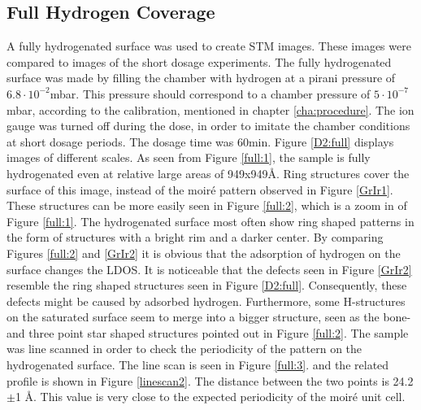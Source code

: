 \subsection{Full Hydrogen Coverage}
A fully hydrogenated surface was used to create STM images. These images were compared to images of the short dosage experiments. The fully hydrogenated surface was made by filling the chamber with hydrogen at a pirani pressure of $6.8 \cdot 10^{-2}$mbar. This pressure should correspond to a chamber pressure of $5 \cdot 10^{-7}$mbar, according to the calibration, mentioned in chapter \ref{cha:procedure}. The ion gauge was turned off during the dose, in order to imitate the chamber conditions at short dosage periods. The dosage time was 60min. Figure \ref{D2:full} displays images of different scales. As seen from Figure \ref{full:1}, the sample is fully hydrogenated even at relative large areas of 949x949Å. Ring structures cover the surface of this image, instead of the moiré pattern observed in Figure \ref{GrIr1}. These structures can be more easily seen in Figure \ref{full:2}, which is a zoom in of Figure \ref{full:1}. The hydrogenated surface most often show ring shaped patterns in the form of structures with a bright rim and a darker center. By comparing Figures \ref{full:2} and \ref{GrIr2} it is obvious that the adsorption of hydrogen on the surface changes the LDOS. It is noticeable that the defects seen in Figure \ref{GrIr2} resemble the ring shaped structures seen in Figure \ref{D2:full}. Consequently, these defects might be caused by adsorbed hydrogen. Furthermore, some H-structures on the saturated surface seem to merge into a bigger structure, seen as the bone- and three point star shaped structures pointed out in Figure \ref{full:2}.
The sample was line scanned in order to check the periodicity of the pattern on the hydrogenated surface. The line scan is seen in Figure \ref{full:3}. and the related profile is shown in Figure \ref{linescan2}. The distance between the two points is 24.2 $\pm$1 Å. This value is very close to the expected periodicity of the moiré unit cell.\cite{1367-2630-11-2-023006}\\


